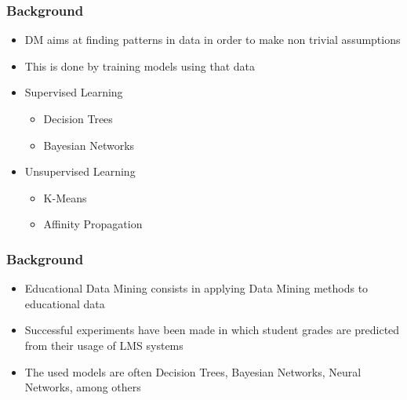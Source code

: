 \begin{frame}
\frametitle{Background}


\begin{itemize}
    \item DM aims at finding patterns in data in order to make non trivial assumptions
    \item This is done by training models using that data
\end{itemize}


\begin{itemize}
    \item Supervised Learning
    \begin{itemize}
        \item Decision Trees
        \item Bayesian Networks
    \end{itemize}

    \item Unsupervised Learning
    \begin{itemize}
        \item K-Means
        \item Affinity Propagation
    \end{itemize}
\end{itemize}
\end{frame}

\begin{frame}
\frametitle{Background}


\begin{itemize}
    \item Educational Data Mining consists in applying Data Mining methods to educational data
    \item Successful experiments have been made in which student grades are predicted from their usage of LMS systems
    \item The used models are often Decision Trees, Bayesian Networks, Neural Networks, among others
\end{itemize}

\end{frame}
